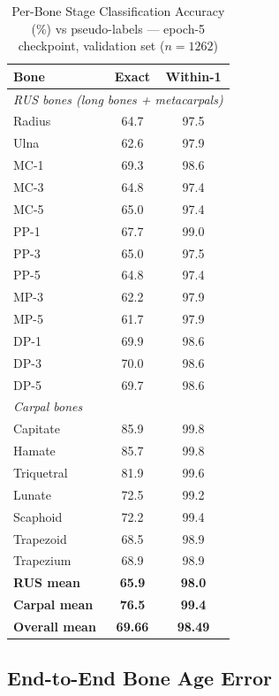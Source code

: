 \documentclass[journal]{IEEEtran}
\begin{document}
\begin{table}[!t]
  \centering
  \caption{Per-Bone Stage Classification Accuracy (\%) vs pseudo-labels —
    epoch-5 checkpoint, validation set ($n{=}1262$)}
  \label{tab:accuracy}
  \begin{tabular}{lcc}
    \toprule
    Bone & Exact & Within-1 \\
    \midrule
    \multicolumn{3}{l}{\textit{RUS bones (long bones + metacarpals)}} \\
    Radius        & 64.7 & 97.5 \\
    Ulna          & 62.6 & 97.9 \\
    MC-1          & 69.3 & 98.6 \\
    MC-3          & 64.8 & 97.4 \\
    MC-5          & 65.0 & 97.4 \\
    PP-1          & 67.7 & 99.0 \\
    PP-3          & 65.0 & 97.5 \\
    PP-5          & 64.8 & 97.4 \\
    MP-3          & 62.2 & 97.9 \\
    MP-5          & 61.7 & 97.9 \\
    DP-1          & 69.9 & 98.6 \\
    DP-3          & 70.0 & 98.6 \\
    DP-5          & 69.7 & 98.6 \\
    \midrule
    \multicolumn{3}{l}{\textit{Carpal bones}} \\
    Capitate      & 85.9 & 99.8 \\
    Hamate        & 85.7 & 99.8 \\
    Triquetral    & 81.9 & 99.6 \\
    Lunate        & 72.5 & 99.2 \\
    Scaphoid      & 72.2 & 99.4 \\
    Trapezoid     & 68.5 & 98.9 \\
    Trapezium     & 68.9 & 98.9 \\
    \midrule
    \textbf{RUS mean}    & \textbf{65.9} & \textbf{98.0} \\
    \textbf{Carpal mean} & \textbf{76.5} & \textbf{99.4} \\
    \textbf{Overall mean} & \textbf{69.66} & \textbf{98.49} \\
    \bottomrule
  \end{tabular}
\end{table}

\subsection{End-to-End Bone Age Error}
\end{document}
